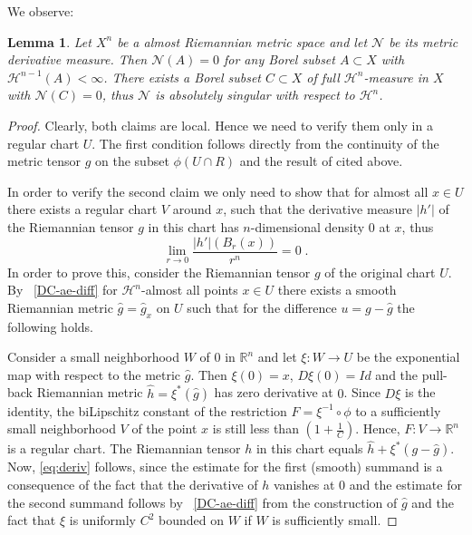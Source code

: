 \documentclass[12pt,leqno]{amsart}
\numberwithin{equation}{section}
\newtheorem{lem}[thm]{Lemma}
\theoremstyle{definition}
\theoremstyle{remark}
\newcommand{\R}{\mathbb{R}}
\begin{document}
We observe:
\begin{lem}
Let $X^n$ be a almost Riemannian metric space and let $\mathcal N$ be its metric derivative measure.
Then $\mathcal N (A)=0$ for any Borel subset $A\subset X$ with $\mathcal H^{n-1} (A)<\infty$.
There exists a Borel subset $C\subset X$ of full $\mathcal H^n$-measure in $X$ with
$\mathcal N(C)=0$, thus $\mathcal N$ is absolutely singular with respect to $\mathcal H^n$.
\end{lem}


\begin{proof}
Clearly, both claims are local. Hence we need to verify them only in a regular chart $U$.  The first condition
follows directly from the continuity of the metric tensor $g$ on the subset $\phi(U\cap R)$ and the result of \cite{Goffmann}
cited above.

 In order to verify the second claim we only need to show   that for almost all $x\in U$ there exists a
 regular chart $V$
 around $x$, such that the derivative measure $|h'|$ of  the Riemannian tensor $g$ in this  chart has $n$-dimensional density $0$
 at $x$, thus
 \begin{equation} \label{eq:deriv}
 \lim _{r\to 0} \frac {|h'| (B_r (x))} {r^n} =0 \;.
 \end{equation}
 In order to prove this, consider the Riemannian tensor $g$ of the original chart $U$.  By ~\eqref{DC-ae-diff} for $\mathcal H^n$-almost all
 points $x\in U$ there exists a  smooth Riemannian metric $\hat g =\hat g_x$ on $U$ such that  for the difference
 $u=g-\hat g$  the following holds.

Consider a small neighborhood $W$ of $0$ in $\R^n$ and let $\xi :W\to U$ be the exponential map with respect to the metric
$\hat g$. Then $\xi (0)=x$, $D\xi  (0) =Id$  and  the  pull-back Riemannian metric $\hat h= \xi^{\ast}  (\hat g)$  has zero derivative at $0$.    Since $D\xi$ is the identity, the biLipschitz constant of the restriction $F=\xi ^{-1} \circ \phi$ to a sufficiently
small neighborhood $V$ of the point $x$ is still less than $(1 + \frac 1 C)$.      Hence, $F:V\to \R^n$ is a regular chart. The Riemannian tensor $h$ in this chart equals $\hat h  +\xi^{\ast } (g-\hat g)$.
Now, \eqref{eq:deriv} follows, since the estimate for the first (smooth) summand is a consequence of the fact that the derivative of $h$ vanishes at $0$ and  the estimate for the second summand follows by  ~\eqref{DC-ae-diff} from the construction of $\hat g$ and the fact that $\xi$ is uniformly $C^2$ bounded on $W$ if $W$ is sufficiently small.  
\end{proof}
\end{document}
